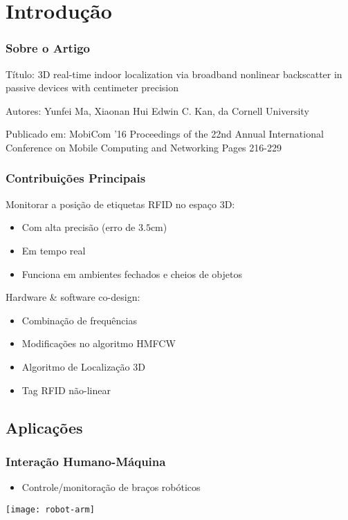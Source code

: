 \section{Introdução}


\begin{frame}
    \frametitle{Sobre o Artigo}
    \alert{Título:} 3D real-time indoor localization via broadband nonlinear backscatter in
    passive devices with centimeter precision

    \alert{Autores:} Yunfei Ma, Xiaonan Hui Edwin C. Kan, da \alert{Cornell University}

    \alert{Publicado em:} MobiCom '16 Proceedings of the 22nd Annual
    International Conference on Mobile Computing and Networking Pages 216-229

\end{frame}

\begin{frame}
  \frametitle{Contribuições Principais}

    Monitorar a posição de etiquetas RFID no espaço 3D:

    \begin{itemize}
      \item Com \alert{alta precisão} (erro de $3.5$cm)
      \item Em \alert{tempo real}
      \item Funciona em \alert{ambientes fechados e cheios de objetos}
    \end{itemize}

    Hardware \& software co-design:

    \begin{itemize}
        \item Combinação de frequências
        \item Modificações no algoritmo HMFCW
        \item Algoritmo de Localização 3D
        \item Tag RFID não-linear
    \end{itemize}
\end{frame}

\subsection{Aplicações}


\begin{frame}
  \frametitle{Interação Humano-Máquina}
  \begin{itemize}
    \item  Controle/monitoração de braços robóticos
  \end{itemize}

  \begin{center}
    \texttt{[image: robot-arm]}
  \end{center}
\end{frame}


